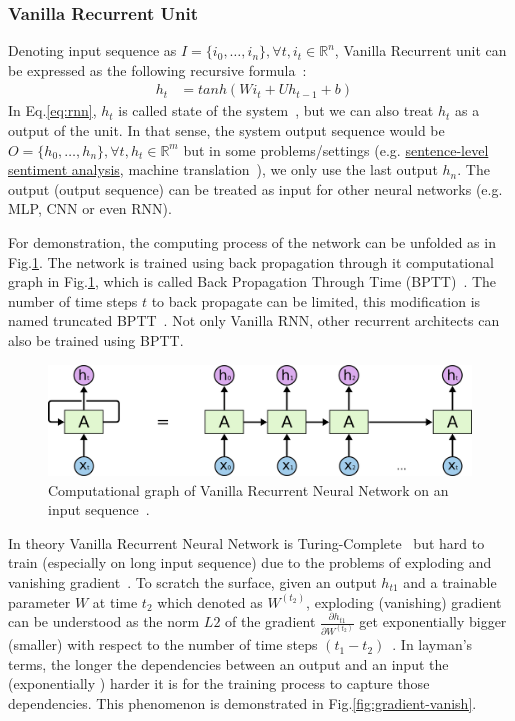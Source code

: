 \subsubsection{Vanilla Recurrent Unit}\label{sec:vanilla-rnn}
Denoting input sequence as \(I = \{i_0,\ldots,i_n\}, \forall t, i_t \in \mathbb{R}^n\), Vanilla Recurrent unit can be expressed as the following recursive formula~\cite{treeLSTM}:
\begin{align}
      h_t &= tanh(Wi_t + Uh_{t-1} + b)&\label{eq:rnn}
\end{align}
In Eq.\ref{eq:rnn}, \(h_t\) is called state of the system~\cite{deeplearning-book}, but we can also treat \(h_t\) as a output of the unit.  
In that sense, the system output sequence would be \(O = \{h_0,\ldots,h_n\}, \forall t, h_t \in \mathbb{R}^m\) but in some problems/settings (e.g. \hyperref[sec:sent-level]{sentence-level sentiment analysis}, machine translation~\cite{SutskeverVL14}), we only use the last output \(h_n\).
The output (output sequence) can be treated as input for other neural networks (e.g. MLP, CNN or even RNN).
 
For demonstration, the computing process of the network can be unfolded as in Fig.\ref{fig:rnn-unfold}. 
The network is trained using back propagation through it computational graph in Fig.\ref{fig:rnn-unfold}, which is called Back Propagation Through Time (BPTT)~\cite{BPTT}. 
The number of time steps \(t\) to back propagate can be limited, this modification is named truncated BPTT~\cite{truncatedBPTT}. 
Not only Vanilla RNN, other recurrent architects can also be trained using BPTT.

\begin{figure}[H]
    \centering
    \includegraphics[scale=0.4]{figure/rnn-unroll}
    \caption[Vanilla Recurrent Neural Network]{Computational graph of Vanilla Recurrent Neural Network on an input sequence~\cite{colah-lsmt}.}
    \label{fig:rnn-unfold}
\end{figure}
\label{sec:gradient-vanish}
In theory Vanilla Recurrent Neural Network is Turing-Complete~\cite{rnn-turing-complete} but  hard to train (especially on long input sequence) due to the problems of exploding and vanishing gradient~\cite{Bengio1994}. 
To scratch the surface, given an output \(h_{t1}\) and a trainable parameter \(W\) at time \(t_2\) which denoted as \(W^{(t_2)}\),  exploding (vanishing) gradient can be understood as the norm \(L2\) of the gradient \(\frac{\partial h_{t1}}{\partial W^{(t_2)}}\) get exponentially bigger (smaller) with respect to the number of time steps \((t_1-t_2)\)~\cite{Bengio1994}.
In layman's terms, the longer the dependencies between an output and an input the (exponentially ) harder it is for the training process to capture those dependencies.
This phenomenon is demonstrated in Fig.\ref{fig:gradient-vanish}. 

